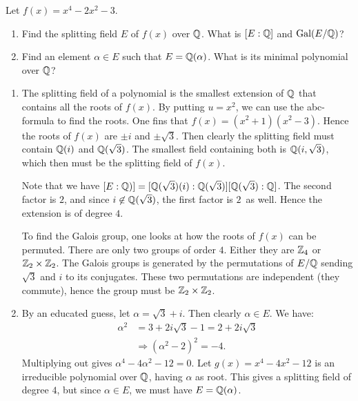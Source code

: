 \documentclass[11pt, english]{article}
\begin{document}
\begin{exc}[Eksamen 2008, 3]
Let $f(x)= x^4-2x^2-3$. 
\begin{enumerate}
	\item Find the splitting field $E$ of $f(x)$ over $\mathbb{Q}$. What is $[E:\mathbb{Q}]$ and $\text{Gal}(E/\mathbb{Q})$?
	\item Find an element $\alpha \in E$ such that $E=\mathbb{Q}(\alpha)$. What is its minimal polynomial over $\mathbb{Q}$?
\end{enumerate}
\end{exc}
\begin{sol}
\begin{enumerate}
	\item The splitting field of a polynomial is the smallest extension of $\mathbb{Q}$ that contains all the roots of $f(x)$. By putting $u=x^2$, we can use the abc-formula to find the roots. One fins that $f(x)=(x^2+1)(x^2-3)$. Hence the roots of $f(x)$ are $\pm i$ and $\pm \sqrt{3}$. Then clearly the splitting field must contain $\mathbb{Q}(i)$ and $\mathbb{Q}(\sqrt 3)$. The smallest field containing both is $\mathbb{Q}(i, \sqrt 3)$, which then must be the splitting field of $f(x)$. 

	Note that we have $[E:\mathbb{Q})]=[\mathbb{Q}(\sqrt 3)(i):\mathbb{Q}(\sqrt 3)][\mathbb{Q}(\sqrt 3):\mathbb{Q}]$. The second factor is $2$, and since $i \not \in \mathbb{Q}(\sqrt 3)$, the first factor is $2$ as well. Hence the extension is of degree $4$.

	To find the Galois group, one looks at how the roots of $f(x)$ can be permuted. There are only two groups of order $4$. Either they are $\mathbb{Z}_4$ or $\mathbb{Z}_2 \times \mathbb{Z}_2$. The Galois groups is generated by the permutations of $E/\mathbb{Q}$ sending $\sqrt 3$ and $i$ to its conjugates. These two permutations are independent (they commute), hence the group must be $\mathbb{Z}_2 \times \mathbb{Z}_2$.
	\item By an educated guess, let $\alpha=\sqrt 3 + i$. Then clearly $\alpha \in E$. We have:
	\begin{align*}
	\alpha^2 &= 3 + 2 i \sqrt 3  -1 = 2 + 2i  \sqrt 3 \\
	&\Rightarrow  (\alpha^2-2)^2 = -4.
	\end{align*}
	Multiplying out gives $\alpha^4-4\alpha^2-12=0$. Let $g(x)=x^4-4x^2-12$ is an irreducible polynomial over $\mathbb{Q}$, having $\alpha$ as root. This gives a splitting field of degree $4$, but since $\alpha \in E$, we must have $E= \mathbb{Q}(\alpha)$.
\end{enumerate}
\end{sol}
\end{document}
